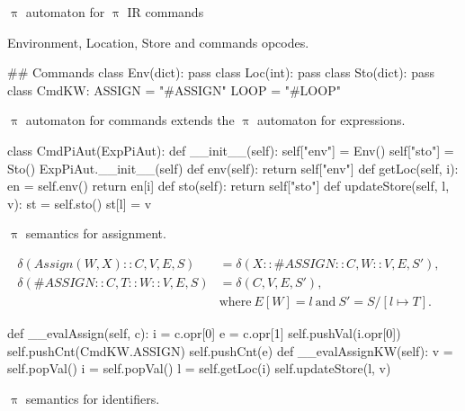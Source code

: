 \documentclass{beamer}
\begin{document}
\begin{frame}{{\color{red}$\uppi$ automaton} for {\color{red}$\uppi$ IR} commands}

Environment, Location, Store and commands opcodes.

\begin{python}
## Commands
class Env(dict): pass
class Loc(int): pass
class Sto(dict): pass
class CmdKW:
    ASSIGN = "#ASSIGN"
    LOOP = "#LOOP"
\end{python}

\framebreak

{\color{red}$\uppi$ automaton} for commands extends the {\color{red}$\uppi$ automaton}  for expressions.

\begin{python}    
class CmdPiAut(ExpPiAut): 
    def __init__(self):    
        self["env"] = Env()
        self["sto"] = Sto()
        ExpPiAut.__init__(self)
    def env(self):
        return self["env"]
    def getLoc(self, i):
        en = self.env()
        return en[i]
    def sto(self):
        return self["sto"]
    def updateStore(self, l, v):
        st = self.sto()
        st[l] = v
\end{python}

\framebreak
        
{\color{red}$\uppi$}  semantics for assignment.

\begin{scriptsize}
\begin{align}
\delta(Assign(W, X) :: C, V, E, S) & = \delta(X :: \#ASSIGN :: C, W :: V, E, S'), \nonumber \\
\delta(\#ASSIGN :: C, T :: W :: V, E, S) & = \delta(C, V, E, S'), & \nonumber \\ & \text{where}~ E[W] = l ~\text{and}~ S' = S/[l \mapsto T]. \nonumber
\end{align}
\end{scriptsize}

\begin{python}
    def __evalAssign(self, c): 
        i = c.opr[0]
        e = c.opr[1]
        self.pushVal(i.opr[0])
        self.pushCnt(CmdKW.ASSIGN)
        self.pushCnt(e)
    def __evalAssignKW(self):
        v = self.popVal()
        i = self.popVal()
        l = self.getLoc(i)
        self.updateStore(l, v) 
\end{python}

\framebreak

{\color{red}$\uppi$}  semantics for identifiers.
        

\end{frame}
\end{document}
